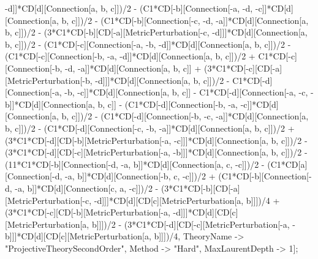 -d]]*CD[d][Connection[a, b, c]])/2 - (C1*CD[-b][Connection[-a, -d, -c]]*CD[d][Connection[a, b, c]])/2 - (C1*CD[-b][Connection[-c, -d, -a]]*CD[d][Connection[a, b, c]])/2 - (3*C1*CD[-b][CD[-a][MetricPerturbation[-c, -d]]]*CD[d][Connection[a, b, c]])/2 - (C1*CD[-c][Connection[-a, -b, -d]]*CD[d][Connection[a, b, c]])/2 - (C1*CD[-c][Connection[-b, -a, -d]]*CD[d][Connection[a, b, c]])/2 + C1*CD[-c][Connection[-b, -d, -a]]*CD[d][Connection[a, b, c]] + (3*C1*CD[-c][CD[-a][MetricPerturbation[-b, -d]]]*CD[d][Connection[a, b, c]])/2 - C1*CD[-d][Connection[-a, -b, -c]]*CD[d][Connection[a, b, c]] - C1*CD[-d][Connection[-a, -c, -b]]*CD[d][Connection[a, b, c]] - (C1*CD[-d][Connection[-b, -a, -c]]*CD[d][Connection[a, b, c]])/2 - (C1*CD[-d][Connection[-b, -c, -a]]*CD[d][Connection[a, b, c]])/2 - (C1*CD[-d][Connection[-c, -b, -a]]*CD[d][Connection[a, b, c]])/2 + (3*C1*CD[-d][CD[-b][MetricPerturbation[-a, -c]]]*CD[d][Connection[a, b, c]])/2 - (3*C1*CD[-d][CD[-c][MetricPerturbation[-a, -b]]]*CD[d][Connection[a, b, c]])/2 - (11*C1*CD[-b][Connection[-d, -a, b]]*CD[d][Connection[a, c, -c]])/2 - (C1*CD[a][Connection[-d, -a, b]]*CD[d][Connection[-b, c, -c]])/2 + (C1*CD[-b][Connection[-d, -a, b]]*CD[d][Connection[c, a, -c]])/2 - (3*C1*CD[-b][CD[-a][MetricPerturbation[-c, -d]]]*CD[d][CD[c][MetricPerturbation[a, b]]])/4 + (3*C1*CD[-c][CD[-b][MetricPerturbation[-a, -d]]]*CD[d][CD[c][MetricPerturbation[a, b]]])/2 - (3*C1*CD[-d][CD[-c][MetricPerturbation[-a, -b]]]*CD[d][CD[c][MetricPerturbation[a, b]]])/4, TheoryName -> "ProjectiveTheorySecondOrder", Method -> "Hard", MaxLaurentDepth -> 1]; 